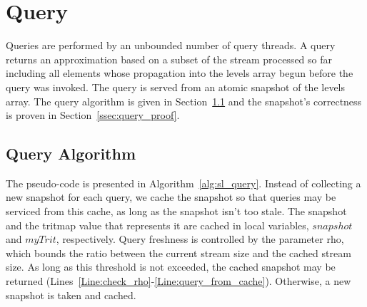 \section{Query} \label{sec:query} %


Queries are performed by an unbounded number of query threads. A query returns an approximation based on a subset of the stream processed so far including all elements whose propagation into the levels array begun before the query was invoked. The query is served from an atomic snapshot of the levels array. The query algorithm is given in Section~\ref{ssec:query_alg} and the snapshot's correctness is proven in Section~\ref{ssec:query_proof}.

\subsection{Query Algorithm} \label{ssec:query_alg} %

The pseudo-code is presented in Algorithm~\ref{alg:sl_query}. Instead of collecting a new snapshot for each query, we cache the snapshot so that queries may be serviced from this cache, as long as the snapshot isn't too stale. The snapshot and the tritmap value that represents it are cached in local variables, $\mathit{snapshot}$ and $\mathit{myTrit}$, respectively. Query freshness is controlled by the parameter \gls{rho}, which bounds the ratio between the current stream size and the cached stream size. As long as this threshold is not exceeded, the cached snapshot may be returned (Lines~\ref{Line:check_rho}-\ref{Line:query_from_cache}). Otherwise, a new snapshot is taken and cached. 


